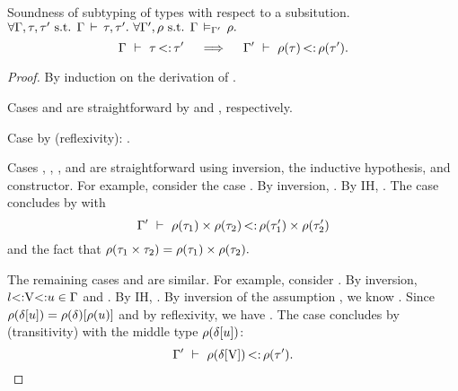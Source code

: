 
\begin{theorem}{Soundness of subtyping of types with respect to a subsitution.}%
\label{thm:subty-sound-subst}
    $\forall \AEnv, \ty, \ty' \text{ s.t. } \tyvlddflt{\ty, \ty'}.\ 
     \forall \AEnv', \substvars \text{ s.t. } \vldinenvdflt{\substvars}.$
     \[ 
        \Gamma\ \vdash\ \tau \operatorname{<:} \tau' \quad\implies\quad
        \Gamma'\ \vdash\ \rho(\tau) \operatorname{<:} \rho(\tau').
     \]
\end{theorem}
\begin{proof}
    By induction on the derivation of .

    Cases  and  are straightforward by  and
    \RST{Bot}, respectively. 

    Case  by  (reflexivity):
    \subty{\AEnv'}{\substvars(\vany)}{\substvars(\vany)}.

    Cases , , , and  are
    straightforward using inversion, the inductive hypothesis, and constructor.
    For example, consider the case \RST{Tuple}
    .
    By inversion, .
    By IH, .
    The case concludes by \RST{Tuple} with 
    \[\Gamma'\ \vdash\ \rho(\tau_1) \times \rho(\tau_2) \operatorname{<:} \rho(\tau'_1) \times \rho(\tau'_2)\]
    and the fact that $\rho(\tau_1 \times \tau_2) = 
    \rho(\tau_1) \times \rho(\tau_2).$

    The remaining cases  and  are similar.
    For example, consider \RST{VarLeft} .
    By inversion, $l{\operatorname{<:}}\mathrm{V}{\operatorname{<:}}u \in \Gamma$ and
    \subtydflt{\plug\dctx{\tyub}}{\ty'}.
    By IH, .
    By inversion of the assumption \vldinenvdflt{\substvars}, we know
    \subty{\AEnv'}{\substvars(\vany)}{\substvars(\tyub)}.
    Since $\rho(\delta[u]) = 
    \rho(\delta)[\rho(u)]$ and
     by reflexivity,
    we have \subty{\AEnv'}{\plug{\substvars(\dctx)}{\substvars(\vany)}}
    {\plug{\substvars(\dctx)}{\substvars(\tyub)}}.
    The case concludes by  (transitivity) with the
    middle type $\rho(\delta[u])$:
    \[\Gamma'\ \vdash\ \rho(\delta[\mathrm{V}]) \operatorname{<:} \rho(\tau').\]
\end{proof}
